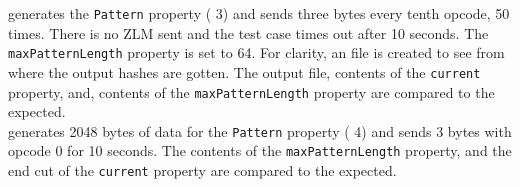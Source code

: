 {} generates the \verb+Pattern+ property {( 3)} and sends three bytes every tenth opcode, 50 times. There is no ZLM sent and the test case times out after 10 seconds. The \verb+maxPatternLength+ property is set to 64. For clarity, an {} file is created to see from where the output hashes are gotten. The output file, contents of the \verb+current+ property, and, contents of the \verb+maxPatternLength+ property are compared to the expected.\\

{} generates 2048 bytes of data for the \verb+Pattern+ property {( 4)} and sends 3 bytes with opcode 0 for 10 seconds. The contents of the \verb+maxPatternLength+ property, and the end cut of the \verb+current+ property are compared to the expected. 

